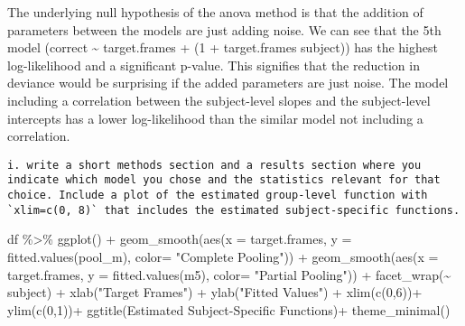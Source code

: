 \documentclass[
]{article}
\newenvironment{Shaded}{\begin{snugshade}}{\end{snugshade}}
\newcommand{\AttributeTok}[1]{\textcolor[rgb]{0.77,0.63,0.00}{#1}}
\newcommand{\DecValTok}[1]{\textcolor[rgb]{0.00,0.00,0.81}{#1}}
\newcommand{\FunctionTok}[1]{\textcolor[rgb]{0.00,0.00,0.00}{#1}}
\newcommand{\NormalTok}[1]{#1}
\newcommand{\SpecialCharTok}[1]{\textcolor[rgb]{0.00,0.00,0.00}{#1}}
\newcommand{\StringTok}[1]{\textcolor[rgb]{0.31,0.60,0.02}{#1}}
\begin{document}
The underlying null hypothesis of the anova method is that the addition
of parameters between the models are just adding noise. We can see that
the 5th model (correct \textasciitilde{} target.frames + (1 +
target.frames \textbar{} subject)) has the highest log-likelihood and a
significant p-value. This signifies that the reduction in deviance would
be surprising if the added parameters are just noise. The model
including a correlation between the subject-level slopes and the
subject-level intercepts has a lower log-likelihood than the similar
model not including a correlation.

\begin{verbatim}
i. write a short methods section and a results section where you indicate which model you chose and the statistics relevant for that choice. Include a plot of the estimated group-level function with `xlim=c(0, 8)` that includes the estimated subject-specific functions.
\end{verbatim}

\begin{Shaded}
\begin{Highlighting}[]
\NormalTok{df }\SpecialCharTok{\%\textgreater{}\%} \FunctionTok{ggplot}\NormalTok{() }\SpecialCharTok{+}
  \FunctionTok{geom\_smooth}\NormalTok{(}\FunctionTok{aes}\NormalTok{(}\AttributeTok{x =}\NormalTok{ target.frames, }\AttributeTok{y =} \FunctionTok{fitted.values}\NormalTok{(pool\_m), }\AttributeTok{color=} \StringTok{"Complete Pooling"}\NormalTok{)) }\SpecialCharTok{+}
  \FunctionTok{geom\_smooth}\NormalTok{(}\FunctionTok{aes}\NormalTok{(}\AttributeTok{x =}\NormalTok{ target.frames, }\AttributeTok{y =} \FunctionTok{fitted.values}\NormalTok{(m5), }\AttributeTok{color=} \StringTok{"Partial Pooling"}\NormalTok{)) }\SpecialCharTok{+} 
  \FunctionTok{facet\_wrap}\NormalTok{(}\SpecialCharTok{\textasciitilde{}}\NormalTok{ subject) }\SpecialCharTok{+}
  \FunctionTok{xlab}\NormalTok{(}\StringTok{"Target Frames"}\NormalTok{) }\SpecialCharTok{+} 
  \FunctionTok{ylab}\NormalTok{(}\StringTok{"Fitted Values"}\NormalTok{) }\SpecialCharTok{+}
  \FunctionTok{xlim}\NormalTok{(}\FunctionTok{c}\NormalTok{(}\DecValTok{0}\NormalTok{,}\DecValTok{6}\NormalTok{))}\SpecialCharTok{+}
  \FunctionTok{ylim}\NormalTok{(}\FunctionTok{c}\NormalTok{(}\DecValTok{0}\NormalTok{,}\DecValTok{1}\NormalTok{))}\SpecialCharTok{+}
  \FunctionTok{ggtitle}\NormalTok{(}\StringTok{\textquotesingle{}Estimated Subject{-}Specific Functions\textquotesingle{}}\NormalTok{)}\SpecialCharTok{+}
  \FunctionTok{theme\_minimal}\NormalTok{()}
\end{Highlighting}
\end{Shaded}
\end{document}
